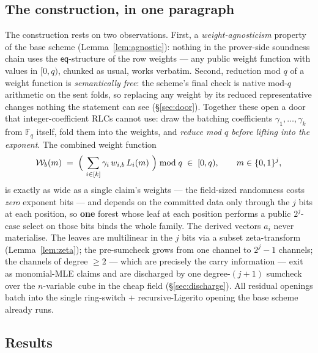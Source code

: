 \documentclass[11pt]{article}
\newcommand{\F}{\mathbb{F}}
\newcommand{\Fq}{\F_q}                 %
\newcommand{\bits}{\{0,1\}}
\newcommand{\eq}{\mathsf{eq}}
\newcommand{\Wc}{\mathcal{W}}          %
\theoremstyle{plain}
\theoremstyle{definition}
\theoremstyle{remark}
\begin{document}
\subsection{The construction, in one paragraph}

The construction rests on two observations. First, a \emph{weight-agnosticism}
property of the base scheme (Lemma~\ref{lem:agnostic}): nothing in the
prover-side soundness chain uses the $\eq$-structure of the row weights ---
any public weight function with values in $[0,q)$, chunked as usual, works
verbatim. Second, reduction mod $q$ of a weight function is \emph{semantically
free}: the scheme's final check is native mod-$q$ arithmetic on the sent
folds, so replacing any weight by its reduced representative changes nothing
the statement can see (\S\ref{sec:door}). Together these open a door that
integer-coefficient RLCs cannot use: draw the batching coefficients
$\gamma_1,\dots,\gamma_k$ from $\Fq$ itself, fold them into the weights, and
\emph{reduce mod $q$ before lifting into the exponent}. The combined weight
function
\[
  \Wc_b(m) \;=\; \Bigl(\ \sum_{i\in[k]} \gamma_i\, w_{i,b}\, L_i(m)\ \Bigr) \bmod q
  \;\in\; [0,q),
  \qquad m\in\bits^{j},
\]
is exactly as wide as a single claim's weights --- the field-sized randomness
costs \emph{zero} exponent bits --- and depends on the committed data only
through the $j$ bits at each position, so \textbf{one} forest whose leaf at
each position performs a public $2^{j}$-case select on those bits binds the
whole family. The derived vectors $a_i$ never materialise. The leaves are
multilinear in the $j$ bits via a subset zeta-transform
(Lemma~\ref{lem:zeta}); the pre-sumcheck grows from one channel to $2^{j}-1$
channels; the channels of degree $\ge 2$ --- which are precisely the carry
information --- exit as monomial-MLE claims and are discharged by one
degree-$(j{+}1)$ sumcheck over the $n$-variable cube in the cheap field
(\S\ref{sec:discharge}). All residual openings batch into the single
ring-switch + recursive-Ligerito opening the base scheme already runs.

\subsection{Results}
\end{document}
